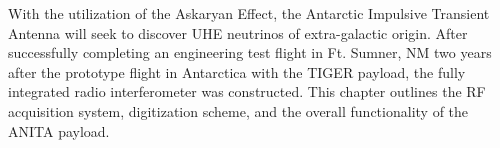 With the utilization of the Askaryan Effect, the Antarctic Impulsive Transient Antenna will seek to discover UHE neutrinos of extra-galactic origin.  After successfully completing an engineering test flight in Ft. Sumner, NM two years after the prototype flight in Antarctica with the TIGER payload, the fully integrated radio interferometer was constructed.  This chapter outlines the RF acquisition system, digitization scheme, and the overall functionality of the ANITA payload.